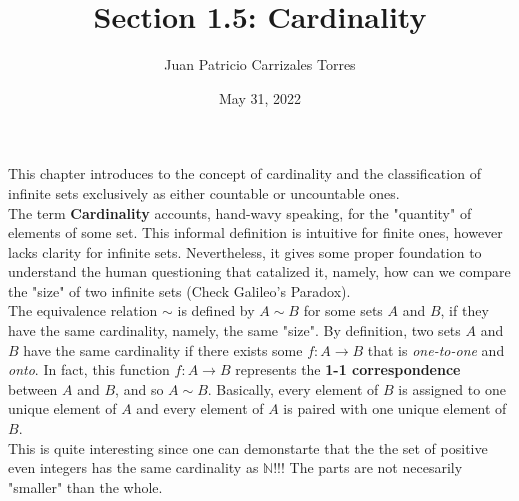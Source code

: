 \documentclass[12pt]{article}
\newcommand{\N}{\mathbb{N}}
\begin{document}
 
	
	\title{Section 1.5: Cardinality}
	\author{Juan Patricio Carrizales Torres}
	\date{May 31, 2022}
	\maketitle
	
	This chapter introduces to the concept of cardinality and the classification of infinite sets exclusively as either countable or uncountable ones. \\
	The term \textbf{Cardinality} accounts, hand-wavy speaking, for the "quantity" of elements of some set. This informal definition is intuitive for finite ones, however lacks clarity for infinite sets. Nevertheless, it gives some proper foundation to understand the human questioning that catalized it, namely, how can we compare the "size" of two infinite sets (Check Galileo's Paradox).\\
	 
	The equivalence relation $\sim$ is defined by $A\sim B$ for some sets $A$ and $B$, if they have the same cardinality, namely, the same "size". By definition, two sets $A$ and $B$ have the same cardinality if there exists some $f: A\to B$ that is \textit{one-to-one} and \textit{onto}. In fact, this function $f: A\to B$ represents the \textbf{1-1 correspondence} between $A$ and $B$, and so $A\sim B$. Basically, every element of $B$ is assigned to one unique element of $A$ and every element of $A$ is paired with one unique element of $B$. \\
	
	This is quite interesting since one can demonstarte that the the set of positive even integers has the same cardinality as $\N$!!! The parts are not necesarily "smaller" than the whole. \\  
	
\end{document}
